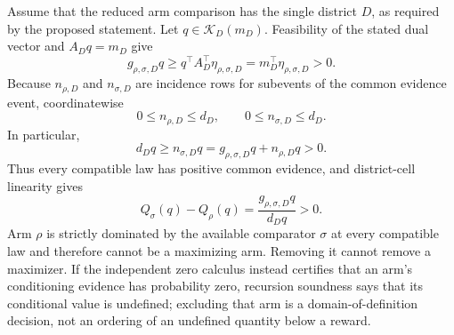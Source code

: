 Assume that the reduced arm comparison has the single district \(D\), as required by the proposed statement.  
Let \(q\in\mathcal K_D(m_D)\).  Feasibility of the stated dual vector and \(A_Dq=m_D\) give
\[
 g_{\rho,\sigma,D}q
 \geq q^\top A_D^\top\eta_{\rho,\sigma,D}
 =m_D^\top\eta_{\rho,\sigma,D}>0.
\]
Because \(n_{\rho,D}\) and \(n_{\sigma,D}\) are incidence rows for subevents of the common evidence event, coordinatewise
\[
 0\leq n_{\rho,D}\leq d_D,
 \qquad 0\leq n_{\sigma,D}\leq d_D.
\]
In particular,
\[
 d_Dq\geq n_{\sigma,D}q
 =g_{\rho,\sigma,D}q+n_{\rho,D}q
 >0.
\]
Thus every compatible law has positive common evidence, and district-cell linearity gives
\[
 Q_\sigma(q)-Q_\rho(q)
 =\frac{g_{\rho,\sigma,D}q}{d_Dq}>0.
\]
Arm \(\rho\) is strictly dominated by the available comparator \(\sigma\) at every compatible law and therefore cannot be a maximizing arm.  Removing it cannot remove a maximizer.  If the independent zero calculus instead certifies that an arm's conditioning evidence has probability zero, recursion soundness says that its conditional value is undefined; excluding that arm is a domain-of-definition decision, not an ordering of an undefined quantity below a reward.